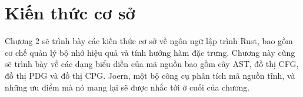 \chapter{Kiến thức cơ sở}
\label{chap:background}

Chương 2 sẽ trình bày các kiến thức cơ sở về ngôn ngữ lập trình Rust, bao gồm cơ chế quản lý bộ nhớ hiệu quả và tính hướng hàm đặc trưng.
Chương này cũng sẽ trình bày về các dạng biểu diễn của mã nguồn bao gồm cây AST, đồ thị CFG, đồ thị PDG và đồ thị CPG.
Joern, một bộ công cụ phân tích mã nguồn tĩnh, và những ưu điểm mà nó mang lại sẽ được nhắc tới ở cuối của chương.




